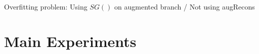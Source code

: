 \documentclass[../../thesis.tex]{subfiles}
\begin{document}
Overfitting problem: Using $SG()$ on augmented branch / Not using augRecons \newline

\section{Main Experiments}






\end{document}
